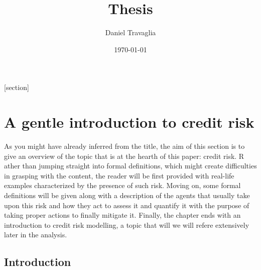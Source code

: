 \documentclass[a4paper,12pt]{article}
\begin{document}

    \setlength{\abovedisplayshortskip}{6pt}
    \setlength{\belowdisplayshortskip}{24pt}
    
    \setlength\parskip{0.5\baselineskip}

    [section]
    \newenvironment{definition}[1][]{\refstepcounter{definition}\par\medskip
        \noindent \textbf{Definition #1:} \rmfamily}{\medskip}
    
    \title{Thesis}
    \author{Daniel Travaglia}
    \date{\today}
    \maketitle

    \pagebreak

    \pagebreak
    
    \section{A gentle introduction to credit risk}

    As you might have already inferred from the title, the aim of this section is to give an overview
    of the topic that is at the hearth of this paper: credit risk. R
    ather than jumping straight into formal definitions, which might create difficulties in grasping with the content, the reader 
    will be first provided with real-life examples characterized by the presence of such risk. Moving on, some
    formal definitions will be given along with a description of the agents that usually take upon this risk 
    and how they act to assess it and quantify it with the purpose of taking proper actions to finally mitigate it. 
    Finally, the chapter ends with an introduction to credit risk modelling, a topic that will we will refere extensively later in the analysis.

    \subsection[]{Introduction}
            
\end{document}
